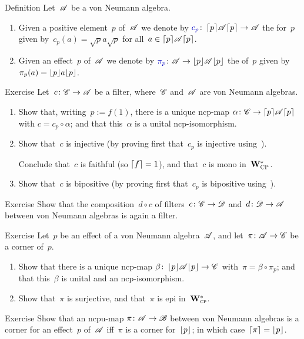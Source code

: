 \documentclass[a]{subfiles}
\begin{document}
\begin{parsec}%
\begin{point}{Definition}%
Let~$\mathscr{A}$ be a von Neumann algebra.
\begin{enumerate}
\item
Given a positive element~$p$
of~$\mathscr{A}$
we denote
by $\Define{c_p}\colon \ceil{p}\!\scrA\!\ceil{p}\to\scrA$%
the %
for~$p$
given by~$c_p(a)=\sqrt{p}a\sqrt{p}$
for all~$a\in\left\lceil p\right\rceil\!\mathscr{A}\!\left\lceil p\right\rceil$.
\item
Given an effect~$p$ of~$\mathscr{A}$
we denote
by $\Define{\pi_p}\colon \scrA\to\floor{p}\!\scrA\!\floor{p}$%
the %
		of~$p$
given by~$\pi_p(a)=\left\lfloor p\right\rfloor\!a\!\left\lfloor p\right\rfloor$.
\end{enumerate}
\end{point}
\begin{point}{Exercise}%
Let~$c\colon \mathscr{C}\to\mathscr{A}$ be a filter,
where~$\mathscr{C}$ and~$\mathscr{A}$ are von Neumann algebras.
\begin{enumerate}
\item
Show that, writing~$p:=f(1)$,
there is a unique
ncp-map $\alpha \colon \mathscr{C}\to \left\lceil p\right\rceil\!\mathscr{A}\!\left\lceil p\right\rceil$
with $c = c_p \circ \alpha$;
and that this~$\alpha$ is a unital ncp-isomorphism.
\item
Show that~$c$ is injective
(by proving first that~$c_p$ is injective
using~).

Conclude that~$c$
is faithful (so $\left\lceil f\right\rceil=1$), and that~$c$ is mono in~$\mathbf{W}^*_{\text{\textsc{CP}}}$.
\item
Show that~$c$ is bipositive
(by proving first that~$c_p$
is bipositive using~).
\end{enumerate}
\end{point}
\begin{point}{Exercise}%
Show that the composition~$d\circ c$
of filters~$c\colon\mathscr{C}\to\mathscr{D}$
and~$d\colon \mathscr{D}\to\mathscr{A}$ 
between von Neumann algebras
is again a filter.
\end{point}
\begin{point}{Exercise}%
Let~$p$ be an effect of a von Neumann algebra~$\mathscr{A}$,
and let~$\pi\colon \mathscr{A}\to\mathscr{C}$ be a corner of~$p$.
\begin{enumerate}
\item
Show that there is a unique ncp-map
$\beta \colon \left\lfloor p\right\rfloor\!\mathscr{A}\!\left\lfloor p\right\rfloor\to\mathscr{C}$
with~$\pi = \beta\circ \pi_p$;
and that this~$\beta$ is unital and an ncp-isomorphism.
\item
Show that~$\pi$ is surjective, and that~$\pi$ is epi in~$\mathbf{W}^*_{\text{\textsc{cp}}}$.
\end{enumerate}
\end{point}
\begin{point}{Exercise}%
Show that an ncpu-map $\pi\colon \mathscr{A}\to\mathscr{B}$
between von Neumann algebras
is a corner for an effect~$p$ of~$\mathscr{A}$
iff~$\pi$ is a corner for~$\left\lfloor p\right\rfloor$;
in which case~$\left\lceil\pi\right\rceil=\left\lfloor p\right\rfloor$.


\end{point}
\end{parsec}
\end{document}
